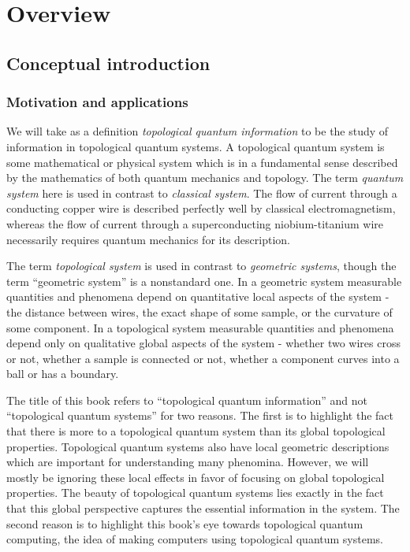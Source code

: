 \section{Overview}
\label{overview}

\subsection{Conceptual introduction}
\label{conceptual-introduction}

\subsubsection{Motivation and applications}

We will take as a definition {\em topological quantum information} to be the study of information in topological quantum systems. A topological quantum system is some mathematical or physical system which is in a fundamental sense described by the mathematics of both quantum mechanics and topology. The term {\em quantum system} here is used in contrast to { \em classical system}. The flow of current through a conducting copper wire is described perfectly well by classical electromagnetism, whereas the flow of current through a superconducting niobium-titanium wire necessarily requires quantum mechanics for its description.

The term {\em topological system} is used in contrast to {\em geometric systems}, though the term “geometric system” is a nonstandard one. In a geometric system measurable quantities and phenomena depend on quantitative local aspects of the system - the distance between wires, the exact shape of some sample, or the curvature of some component. In a topological system measurable quantities and phenomena depend only on qualitative global aspects of the system - whether two wires cross or not, whether a sample is connected or not, whether a component curves into a ball or has a boundary.

The title of this book refers to “topological quantum information” and not “topological quantum systems” for two reasons. The first is to highlight the fact that there is more to a topological quantum system than its global topological properties. Topological quantum systems also have local geometric descriptions which are important for understanding many phenomina. However, we will mostly be ignoring these local effects in favor of focusing on global topological properties. The beauty of topological quantum systems lies exactly in the fact that this global perspective captures the essential information in the system. The second reason is to highlight this book’s eye towards topological quantum computing, the idea of making computers using topological quantum systems. 


